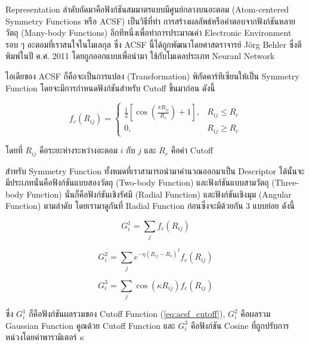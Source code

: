 Representation ลำดับถัดมาคือฟังก์ชันสมมาตรแบบมีศูนย์กลางบนอะตอม (Atom-centered Symmetry Functions หรือ ACSF) เป็นวิธีที่ทำ%
การสร้างผลลัพธ์หรือคำตอบจากฟังก์ชันหลายวัตถุ (Many-body Functions) อีกทีหนึ่งเพื่อทำการประมาณค่า Electronic Environment รอบ ๆ 
อะตอมที่เราสนใจในโมเลกุล ซึ่ง ACSF นี้ได้ถูกพัฒนาโดยศาสตราจารย์ J\"{o}rg Behler ซึ่งตีพิมพ์ในปี ค.ศ. 2011 โดยถูกออกแบบเพื่อนำมา%
ใช้กับโมเดลประเภท Neuranl Network \autocite{behler2011a}

ไอเดียของ ACSF ก็คือจะเป็นการแปลง (Transformation) พิกัดคาร์ทีเซียนให้เป็น Symmetry Function โดยจะมีการกำหนดฟังก์ชันสำหรับ 
Cutoff ขึ้นมาก่อน ดังนี้

\begin{equation}\label{eq:acsf_cutoff}
    f_{c}(R_{ij}) = 
    \begin{cases}
        \frac{1}{2}[\cos(\frac{\pi R_{ij}}{R_{c}}) + 1], & R_{ij} \le R_{c} \\
        0,                                             & R_{ij} \ge R_{c}
    \end{cases}
\end{equation}

\noindent โดยที่ $R_{ij}$ คือระยะห่างระหว่างอะตอม $i$ กับ $j$ และ $R_{c}$ คือค่า Cutoff

สำหรับ Symmetry Function ทั้งหมดที่เราสามารถนำมาคำนวณออกมาเป็น Descriptor ได้นั้นจะมีประเภทนั่นคือฟังก์ชันแบบสองวัตถุ
(Two-body Function) และฟังก์ชันแบบสามวัตถุ (Three-body Function) นั่นก็คือฟังก์ชันเชิงรัศมี (Radial Function) และฟังก์ชันเชิงมุม 
(Angular Function) ตามลำดับ โดยเรามาดูกันที่ Radial Function ก่อนซึ่งจะมีด้วยกัน 3 แบบย่อย ดังนี้

\begin{equation}\label{eq:rf_g1}
    G^{1}_{i} = \sum_{j} f_{c}(R_{ij})
\end{equation}

\begin{equation}\label{eq:rf_g2}
    G^{2}_{i} = \sum_{j} e^{-\eta(R_{ij} - R_{s})^{2}} f_{c}(R_{ij})
\end{equation}

\begin{equation}\label{eq:rf_g3}
    G^{3}_{i} = \sum_{j} \cos(\kappa R_{ij}) f_{c}(R_{ij})
\end{equation}

\noindent ซึ่ง $G^{1}_{i}$ ก็คือฟังก์ชันผลรวมของ Cutoff Function (\ref{eq:acsf_cutoff}), $G^{2}_{i}$ คือผลรวม Gaussian 
Function คูณด้วย Cutoff Function และ $G^{3}_{i}$ คือฟังก์ชัน Cosine ที่ถูกปรับการหน่วงโดยค่าพารามิเตอร์ $\kappa$ 

